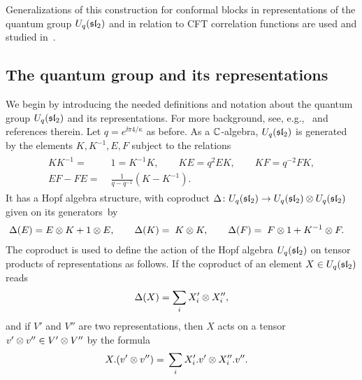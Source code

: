 \documentclass[oneside,english]{amsart}
\numberwithin{equation}{section}
\numberwithin{figure}{section}
\theoremstyle{plain}
\theoremstyle{plain}
\theoremstyle{plain}
\theoremstyle{remark}
\theoremstyle{plain}
\theoremstyle{plain}
\theoremstyle{plain}
\theoremstyle{plain}
\theoremstyle{plain}
\theoremstyle{plain}
\theoremstyle{plain}
\theoremstyle{plain}
\begin{document}
Generalizations of this construction for
conformal blocks in representations of the quantum group ${U}_{q}(\mathfrak{sl}_{2})$ and in
relation to CFT correlation functions are used and studied in~\cite{Flores-Peltola:WJTL_algebra, Flores-Peltola:Colored_braid_representations_and_QSW,
Flores-Peltola:Monodromy_invariant_correlation_function}.



\subsection{\label{sub: quantum group}The quantum group and its representations}

We begin by introducing the needed definitions and notation
about the quantum group ${U}_{q}(\mathfrak{sl}_{2})$ and its representations.
For more background, see, e.g.,~\cite{Kassel-Quantum_groups} and references therein.
Let $q = e^{\ii \pi 4 / \kappa}$ as before.
As a $\mathbb{C}$-algebra, ${U}_{q}(\mathfrak{sl}_{2})$ is generated by the elements $K,K^{-1},E,F$ subject to 
the relations
\begin{align} \label{eq: quantum group relations}
\begin{split}
 KK^{-1}=&\; 1=K^{-1}K,\qquad KE=q^{2}EK,\qquad KF=q^{-2}FK,\\%
 EF-FE=&\; \frac{1}{q-q^{-1}}\left(K-K^{-1}\right) . 
\end{split}
\end{align}
It has a Hopf algebra structure, with coproduct $\Delta \colon {U}_{q}(\mathfrak{sl}_{2}) \rightarrow {U}_{q}(\mathfrak{sl}_{2})\otimes{U}_{q}(\mathfrak{sl}_{2})$ given on its generators~by
\begin{align}\label{eq: coproduct} 
\Hcp(E) = \; & E\tens K + 1\tens E,\qquad
\Hcp(K) = \; K \tens K,\qquad
\Hcp(F) = \; F \tens 1 + K^{-1} \tens F . %
\end{align}
The coproduct is used to define the action of %
the Hopf algebra ${U}_{q}(\mathfrak{sl}_{2})$
on tensor products of representations as follows. If the coproduct of an element $X \in {U}_{q}(\mathfrak{sl}_{2})$ reads
\[ \Delta(X) = \sum_i X_i' \otimes X_i'' , \]
and if $V'$ and $V''$ are two representations, then
$X$ acts on a tensor $v' \otimes v'' \in V' \otimes V''$ by the formula
\begin{align*}
X.(v' \otimes v'') = \; & \sum_i X_i'.v' \otimes X_i''.v'' .
\end{align*}
\end{document}
